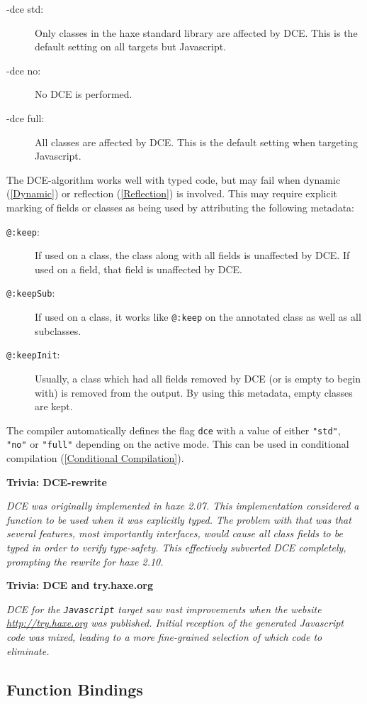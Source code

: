 \documentclass{article}
\newcommand{\target}[1]{#1}
\newcommand{\type}[1]{\texttt{#1}}
\newcommand{\expr}[1]{\texttt{#1}}
\newenvironment{myshaded}
  {\def\FrameCommand{\fboxsep=\topsep\colorbox{bgcolor}}%
  \MakeFramed {\advance\hsize-\width \FrameRestore}}%
 {\endMakeFramed}
\newcommand{\trivia}[2]
	{\begin{myshaded}\noindent\textbf{Trivia: #1}\par\nobreak\noindent\ignorespaces\textit{#2}\end{myshaded}}
\newcommand{\tref}[2]{#1 (\ref{#2})}
\begin{document}
\begin{description}
	\item[-dce std:] Only classes in the haxe standard library are affected by DCE. This is the default setting on all targets but \target{Javascript}.
	\item[-dce no:] No DCE is performed.
	\item[-dce full:] All classes are affected by DCE. This is the default setting when targeting \target{Javascript}.
\end{description}
The DCE-algorithm works well with typed code, but may fail when \tref{dynamic}{Dynamic} or \tref{reflection}{Reflection} is involved. This may require explicit marking of fields or classes as being used by attributing the following metadata:

\begin{description}
	\item[\expr{@:keep}:] If used on a class, the class along with all fields is unaffected by DCE. If used on a field, that field is unaffected by DCE.
	\item[\expr{@:keepSub}:] If used on a class, it works like \expr{@:keep} on the annotated class as well as all subclasses.
	\item[\expr{@:keepInit}:] Usually, a class which had all fields removed by DCE (or is empty to begin with) is removed from the output. By using this metadata, empty classes are kept.
\end{description}
The compiler automatically defines the flag \expr{dce} with a value of either \expr{"std"}, \expr{"no"} or \expr{"full"} depending on the active mode. This can be used in \tref{conditional compilation}{Conditional Compilation}.

\trivia{DCE-rewrite}{DCE was originally implemented in haxe 2.07. This implementation considered a function to be used when it was explicitly typed. The problem with that was that several features, most importantly interfaces, would cause all class fields to be typed in order to verify type-safety. This effectively subverted DCE completely, prompting the rewrite for haxe 2.10.}

\trivia{DCE and try.haxe.org}{DCE for the \type{Javascript} target saw vast improvements when the website \url{http://try.haxe.org} was published. Initial reception of the generated \target{Javascript} code was mixed, leading to a more fine-grained selection of which code to eliminate.}



\subsection{Function Bindings}
\label{Function Bindings}
\end{document}
